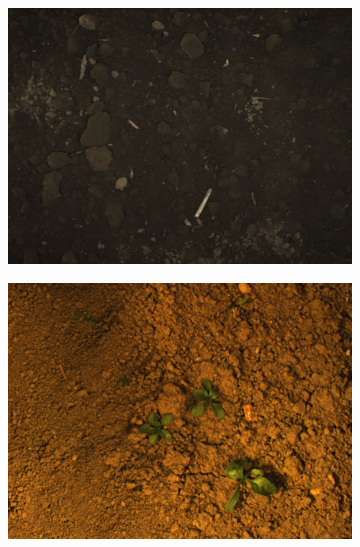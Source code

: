 \documentclass[letterpaper, 10 pt, conference]{ieeeconf}  %
\begin{document}
    \begin{figure}
    \centering
     \begin{subfigure}[b]{0.31\linewidth}
    \includegraphics[width=\linewidth]{pics/bonn/images/bonirob_2016-04-28-12-20-29_6_frame217.png}
   		\caption{}
		\label{bonn_img}    		
   \end{subfigure}
      \begin{subfigure}[b]{0.31\linewidth}
    \includegraphics[width=\linewidth]{pics/stuttgart/images/masks_8mm_fromImages_frame479.png}
   		\caption{}
		\label{stuttgart_img}    		
   \end{subfigure}
           \begin{subfigure}[b]{0.31\linewidth}

\end{subfigure}
\end{figure}
\end{document}
